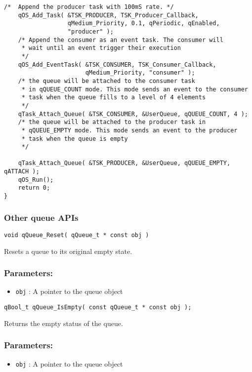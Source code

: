 \begin{lstlisting}[style=CStyle]
    /*  Append the producer task with 100mS rate. */
    qOS_Add_Task( &TSK_PRODUCER, TSK_Producer_Callback, 
                  qMedium_Priority, 0.1, qPeriodic, qEnabled, 
                  "producer" );
    /* Append the consumer as an event task. The consumer will
     * wait until an event trigger their execution
     */
    qOS_Add_EventTask( &TSK_CONSUMER, TSK_Consumer_Callback,
                       qMedium_Priority, "consumer" );
    /* the queue will be attached to the consumer task 
     * in qQUEUE_COUNT mode. This mode sends an event to the consumer
     * task when the queue fills to a level of 4 elements
     */
    qTask_Attach_Queue( &TSK_CONSUMER, &UserQueue, qQUEUE_COUNT, 4 );
    /* the queue will be attached to the producer task in
     * qQUEUE_EMPTY mode. This mode sends an event to the producer
     * task when the queue is empty
     */
     
    qTask_Attach_Queue( &TSK_PRODUCER, &UserQueue, qQUEUE_EMPTY, qATTACH );
    qOS_Run();
    return 0;
}

\end{lstlisting}    

\subsubsection{Other queue APIs}

\begin{lstlisting}[style=CStyle]
void qQueue_Reset( qQueue_t * const obj )
\end{lstlisting}

Resets a queue to its original empty state. 

\subsubsection*{Parameters:}
\begin{itemize}
    \item \lstinline{obj} : A pointer to the queue object
\end{itemize}

\noindent\hrulefill


\begin{lstlisting}[style=CStyle]
qBool_t qQueue_IsEmpty( const qQueue_t * const obj );
\end{lstlisting}

Returns the empty status of the queue. 

\subsubsection*{Parameters:}
\begin{itemize}
    \item \lstinline{obj} : A pointer to the queue object
\end{itemize}

